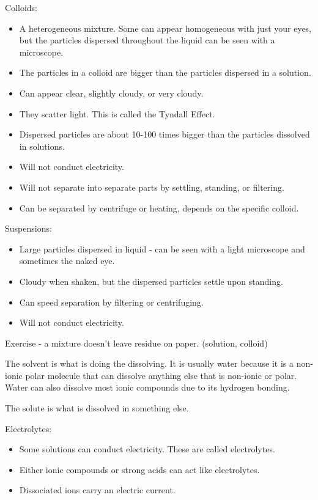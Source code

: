 \documentclass[../hchem.tex]{subfiles}
\begin{document}
Colloids:
\begin{itemize}
    \item A heterogeneous mixture. Some can appear homogeneous with just your eyes, but the particles dispersed throughout the liquid can be seen with a microscope.
    \item The particles in a colloid are bigger than the particles dispersed in a solution.
    \item Can appear clear, slightly cloudy, or very cloudy.
    \item They scatter light. This is called the Tyndall Effect.
    \item Dispersed particles are about 10-100 times bigger than the particles dissolved in solutions.
    \item Will not conduct electricity.
    \item Will not separate into separate parts by settling, standing, or filtering.
    \item Can be separated by centrifuge or heating, depends on the specific colloid.
\end{itemize}

Suspensions:
\begin{itemize}
    \item Large particles dispersed in liquid - can be seen with a light microscope and sometimes the naked eye.
    \item Cloudy when shaken, but the dispersed particles settle upon standing.
    \item Can speed separation by filtering or centrifuging.
    \item Will not conduct electricity.
\end{itemize}

Exercise - a mixture doesn't leave residue on paper. (solution, colloid)

The solvent is what is doing the dissolving. It is usually water because it is a non-ionic polar molecule that can dissolve anything else that is non-ionic or polar. Water can also dissolve most ionic compounds due to its hydrogen bonding.

The solute is what is dissolved in something else.

Electrolytes:
\begin{itemize}
    \item Some solutions can conduct electricity. These are called electrolytes.
    \item Either ionic compounds or strong acids can act like electrolytes.
    \item Dissociated ions carry an electric current.
\end{itemize}
\end{document}
